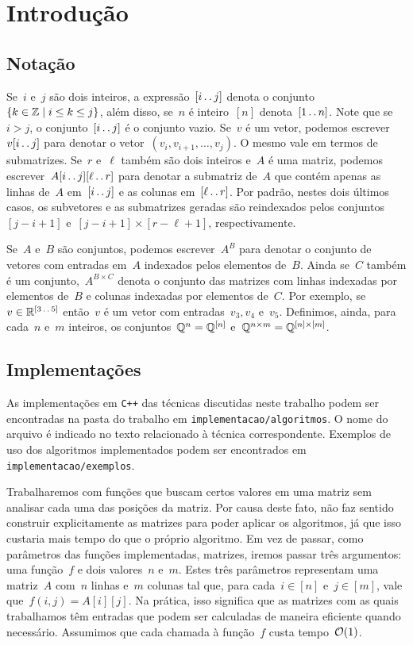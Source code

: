 \chapter{Introdução}
\label{Introducao}

\section{Notação}
Se~$i$ e~$j$ são dois inteiros, a expressão~$[i \,.\,.\, j]$ denota o conjunto~${ \{ k \in \mathbb{Z} \mid i \leq k \leq j \} }$, além disso, se~$n$ é inteiro~$[n]$ denota~$[1 \,.\,.\, n]$. Note que se~$i > j$, o conjunto~$[i \,.\,.\, j]$ é o conjunto vazio. Se~$v$ é um vetor, podemos escrever~$v[i \,.\,.\, j]$ para denotar o vetor~${ (v_i, v_{i+1}, \dots, v_j) }$. O mesmo vale em termos de submatrizes. Se~$r$ e~$\ell$ também são dois inteiros e~$A$ é uma matriz, podemos escrever~$A[i \,.\,.\, j][\ell \,.\,.\, r]$ para denotar a submatriz de~$A$ que contém apenas as linhas de~$A$ em~$[i \,.\,.\, j]$ e as colunas em~$[\ell \,.\,.\, r]$. Por padrão, nestes dois últimos casos, os subvetores e as submatrizes geradas são reindexados pelos conjuntos~$[j - i + 1]$ e~${ [j - i + 1] \times [r - \ell + 1] }$, respectivamente.

Se~$A$ e~$B$ são conjuntos, podemos escrever~$A^B$ para denotar o conjunto de vetores com entradas em~$A$ indexados pelos elementos de~$B$. Ainda se~$C$ também é um conjunto,~$A^{B \times C}$ denota o conjunto das matrizes com linhas indexadas por elementos de~$B$ e colunas indexadas por elementos de~$C$. Por exemplo, se~$v \in \mathbb{R}^{ [3 \,.\,.\, 5] }$ então~$v$ é um vetor com entradas~${ v_3, v_4 }$ e~$v_5$. Definimos, ainda, para cada~$n$ e~$m$ inteiros, os conjuntos~${ \mathbb{Q}^n = \mathbb{Q}^{ [n] } }$ e~${ \mathbb{Q}^{n \times m} = \mathbb{Q}^{[n] \times [m]} }$.

\section{Implementações} \label{Intro:impl}
As implementações em \texttt{C++} das técnicas discutidas neste trabalho podem ser encontradas na pasta do trabalho em \texttt{implementacao/algoritmos}. O nome do arquivo é indicado no texto relacionado à técnica correspondente. Exemplos de uso dos algoritmos implementados podem ser encontrados em \texttt{implementacao/exemplos}.

Trabalharemos com funções que buscam certos valores em uma matriz sem analisar cada uma das posições da matriz. Por causa deste fato, não faz sentido construir explicitamente as matrizes para poder aplicar os algoritmos, já que isso custaria mais tempo do que o próprio algoritmo. Em vez de passar, como parâmetros das funções implementadas, matrizes, iremos passar três argumentos: uma função~$f$ e dois valores~$n$ e~$m$. Estes três parâmetros representam uma matriz~$A$ com~$n$ linhas e~$m$ colunas tal que, para cada~${ i \in [n] }$ e~${ j \in [m] }$, vale que~${ f(i,j) = A[i][j] }$. Na prática, isso significa que as matrizes com as quais trabalhamos têm entradas que podem ser calculadas de maneira eficiente quando necessário. Assumimos que cada chamada à função~$f$ custa tempo~$\mathcal{O}(1)$.


